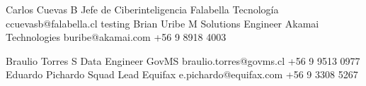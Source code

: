 %
%
%


\begin{referees}
	{Carlos Cuevas B}
	{Jefe de Ciberinteligencia}
	{Falabella Tecnología}
	{ccuevasb@falabella.cl}
	{testing}
	{Brian Uribe M}
	{Solutions Engineer}
	{Akamai Technologies}
	{buribe@akamai.com}
	{+56 9 8918 4003}
\end{referees}

\begin{referees}
	{Braulio Torres S}
	{Data Engineer}
	{GovMS}
	{braulio.torres@govms.cl}
	{+56 9 9513 0977}
	{Eduardo Pichardo}
	{Squad Lead}
	{Equifax}
	{e.pichardo@equifax.com}
	{+56 9 3308 5267}
\end{referees}

